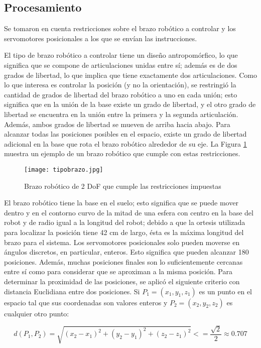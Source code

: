 \subsection{Procesamiento}

Se tomaron en cuenta restricciones sobre el brazo robótico a controlar y los servomotores posicionales a los que se envían las instrucciones.

El tipo de brazo robótico a controlar tiene un diseño antropomórfico, lo que significa que se compone de articulaciones unidas entre sí; además es de dos grados de libertad, lo que implica que tiene exactamente dos articulaciones. Como lo que interesa es controlar la posición (y no la orientación), se restringió la cantidad de grados de libertad del brazo robótico a uno en cada unión; esto significa que en la unión de la base existe un grado de libertad, y el otro grado de libertad se encuentra en la unión entre la primera y la segunda articulación. Además, ambos grados de libertad se mueven de arriba hacia abajo. Para alcanzar todas las posiciones posibles en el espacio, existe un grado de libertad adicional en la base que rota el brazo robótico alrededor de su eje. La Figura \ref{fig:tipobrazo} muestra un ejemplo de un brazo robótico que cumple con estas restricciones.

\begin{figure}[htb]
	\centering
	\texttt{[image: tipobrazo.jpg]}
	\caption{Brazo robótico de 2 DoF que cumple las restricciones impuestas}
	\label{fig:tipobrazo}
\end{figure}

El brazo robótico tiene la base en el suelo; esto significa que se puede mover dentro y en el contorno curvo de la mitad de una esfera con centro en la base del robot y de radio igual a la longitud del robot; debido a que la ortesis utilizada para localizar la posición tiene 42 cm de largo, ésta es la máxima longitud del brazo para el sistema. Los servomotores posicionales solo pueden moverse en ángulos discretos, en particular, enteros. Esto significa que pueden alcanzar 180 posiciones. Además, muchas posiciones finales son lo suficientemente cercanas entre sí como para considerar que se aproximan a la misma posición.  Para determinar la proximidad de las posiciones, se aplicó el siguiente criterio con distancia Euclidiana entre dos posiciones. Si $P_1 = (x_1, y_1, z_1)$ es un punto en el espacio tal que sus coordenadas son valores enteros y $P_2 = (x_2, y_2, z_2)$ es cualquier otro punto:

\begin{equation}
	d(P_1, P_2) = \sqrt{(x_2 - x_1)^2 + (y_2 - y_1)^2 + (z_2 - z_1)^2} <= \frac{\sqrt{2}}{2} \approx 0.707
\end{equation}

